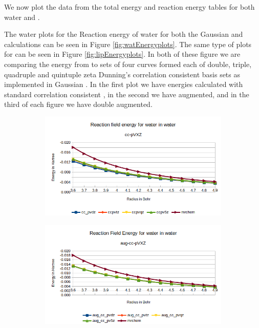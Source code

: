 \documentclass[../master_thesis.tex]{subfiles}
\begin{document}
We now plot the data from the total energy and reaction energy tables for
both water and .

The water plots for the Reaction energy of water for
both the Gaussian and  \mrchem calculations can be seen in Figure \ref{fig:watEnergyplots}.
The same type of plots for  can be seen in Figure \ref{fig:lipEnergyplots}.
In both of these figure we are comparing the energy from \mrchem to sets of four
curves formed each of double, triple, quadruple and quintuple zeta Dunning's correlation
consistent \cite{doi:10.1063/1.456153} basis sets as implemented in Gaussian \cite{G09}.
In the first plot we have energies calculated with standard correlation consistent ,
in the second we have augmented, and in the third of each figure we have double augmented.


\begin{figure}[h!]
  \centering
  \begin{subfigure}[b]{0.75\linewidth}
    \includegraphics[width=\linewidth]{img/Erwat.png}
  \end{subfigure}
  \begin{subfigure}[b]{0.75\linewidth}
    \includegraphics[width=\linewidth]{img/Eraugwat.png}

\end{subfigure}
\end{figure}
\end{document}
